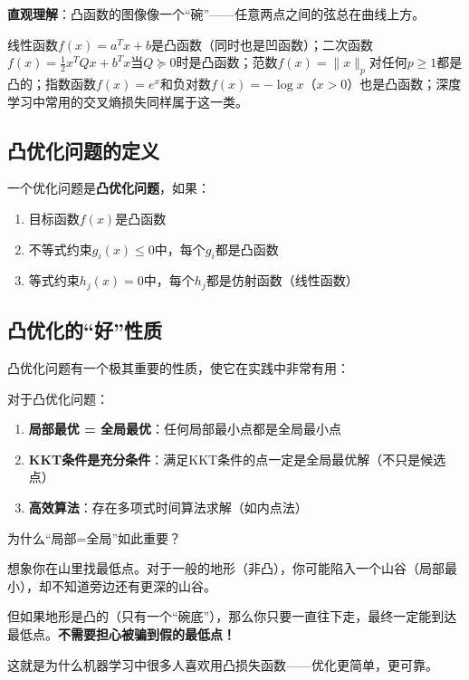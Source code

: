 \textbf{直观理解}：凸函数的图像像一个``碗''——任意两点之间的弦总在曲线上方。

\begin{example}[常见凸函数]
线性函数$f(x) = a^T x + b$是凸函数（同时也是凹函数）；二次函数$f(x) = \frac{1}{2}x^T Q x + b^T x$当$Q \succeq 0$时是凸函数；范数$f(x) = \|x\|_p$对任何$p \geq 1$都是凸的；指数函数$f(x) = e^x$和负对数$f(x) = -\log x$（$x > 0$）也是凸函数；深度学习中常用的交叉熵损失同样属于这一类。
\end{example}

\subsection*{凸优化问题的定义}

\begin{definition}[凸优化问题]
一个优化问题是\textbf{凸优化问题}，如果：
\begin{enumerate}
    \item 目标函数$f(x)$是凸函数
    \item 不等式约束$g_i(x) \leq 0$中，每个$g_i$都是凸函数
    \item 等式约束$h_j(x) = 0$中，每个$h_j$都是仿射函数（线性函数）
\end{enumerate}
\end{definition}

\subsection*{凸优化的``好''性质}

凸优化问题有一个极其重要的性质，使它在实践中非常有用：

\begin{keytheorem}[title=凸优化的核心定理]
对于凸优化问题：
\begin{enumerate}
    \item \textbf{局部最优 = 全局最优}：任何局部最小点都是全局最小点
    \item \textbf{KKT条件是充分条件}：满足KKT条件的点一定是全局最优解（不只是候选点）
    \item \textbf{高效算法}：存在多项式时间算法求解（如内点法）
\end{enumerate}
\end{keytheorem}

\begin{physicalmeaning}
为什么``局部=全局''如此重要？

想象你在山里找最低点。对于一般的地形（非凸），你可能陷入一个山谷（局部最小），却不知道旁边还有更深的山谷。

但如果地形是凸的（只有一个``碗底''），那么你只要一直往下走，最终一定能到达最低点。\textbf{不需要担心被骗到假的最低点！}

这就是为什么机器学习中很多人喜欢用凸损失函数——优化更简单，更可靠。
\end{physicalmeaning}

